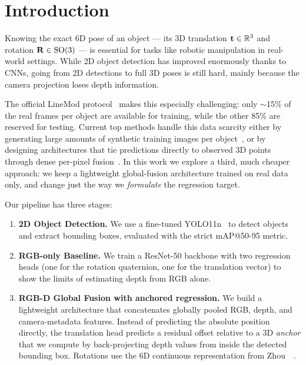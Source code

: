 \section{Introduction}
\label{sec:intro}

Knowing the exact 6D pose of an object --- its 3D translation $\mathbf{t} \in \mathbb{R}^3$ and rotation $\mathbf{R} \in \mathrm{SO}(3)$ --- is essential for tasks like robotic manipulation in real-world settings. While 2D object detection has improved enormously thanks to CNNs, going from 2D detections to full 3D poses is still hard, mainly because the camera projection loses depth information.

The official LineMod protocol~\cite{hinterstoisser2012model} makes this especially challenging: only $\sim$15\% of the real frames per object are available for training, while the other 85\% are reserved for testing. Current top methods handle this data scarcity either by generating large amounts of synthetic training images per object~\cite{he2020pvn3d, he2021ffb6d}, or by designing architectures that tie predictions directly to observed 3D points through dense per-pixel fusion~\cite{wang2019densefusion}. In this work we explore a third, much cheaper approach: we keep a lightweight global-fusion architecture trained on real data only, and change just the way we \emph{formulate} the regression target.

Our pipeline has three stages:

\begin{enumerate}
    \item \textbf{2D Object Detection.} We use a fine-tuned YOLO11n~\cite{ultralytics2024yolo11} to detect objects and extract bounding boxes, evaluated with the strict mAP@50-95 metric.

    \item \textbf{RGB-only Baseline.} We train a ResNet-50 backbone with two regression heads (one for the rotation quaternion, one for the translation vector) to show the limits of estimating depth from RGB alone.

    \item \textbf{RGB-D Global Fusion with anchored regression.} We build a lightweight architecture that concatenates globally pooled RGB, depth, and camera-metadata features. Instead of predicting the absolute position directly, the translation head predicts a residual offset relative to a 3D \emph{anchor} that we compute by back-projecting depth values from inside the detected bounding box. Rotations use the 6D continuous representation from Zhou~\etal~\cite{zhou2019continuity}.
\end{enumerate}

